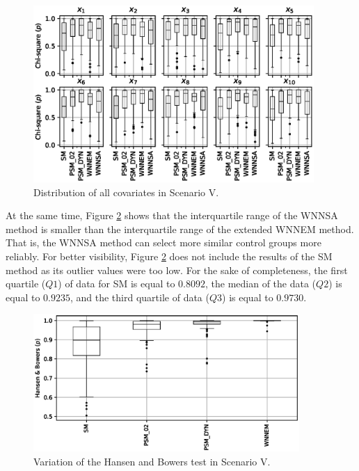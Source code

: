		\begin{figure}[h]
			\centering
			\captionsetup{justification=centering}
			\includegraphics[width=0.95\textwidth]{assets/figures/control_group_selection/wnnsa/scenV/distribution.eps}
			\caption{Distribution of all covariates in Scenario V. %
			}
			\label{fig:wnnsa_scen_V_distribtuion}   
		\end{figure}			
				
		At the same time, Figure \ref{fig:wnnsa_scen_V_hbp} shows that the interquartile range of the WNNSA method is smaller than the interquartile range of the extended WNNEM method. That is, the WNNSA method can select more similar control groups more reliably. For better visibility, Figure  \ref{fig:wnnsa_scen_V_hbp} does not include the results of the SM method as its outlier values were too low. For the sake of completeness, the first quartile ($Q1$) of data for SM is equal to $0.8092$, the median of the data ($Q2$) is equal to $0.9235$, and the third quartile of data ($Q3$) is equal to $0.9730$.
										
		\begin{figure}[h]
			\centering
			\captionsetup{justification=centering}
			\includegraphics[width=0.9\textwidth]{assets/figures/control_group_selection/wnnsa/scenIV/hbp.eps}
			\caption{Variation of the Hansen and Bowers test in Scenario V. %
			}
			\label{fig:wnnsa_scen_V_hbp}    
		\end{figure}
				
